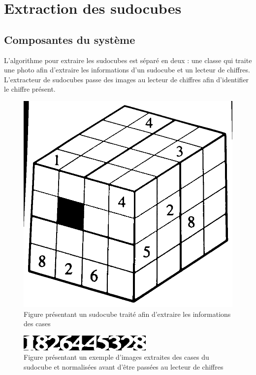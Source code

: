 \section{Extraction des sudocubes}
\subsection{Composantes du système}
L'algorithme pour extraire les sudocubes est séparé en deux : une classe qui traite une photo afin d'extraire les informations d'un sudocube et un lecteur de chiffres. L'extracteur de sudocubes passe des images au lecteur de chiffres afin d'identifier le chiffre présent. 

\begin{figure}[htbp]
\centering
\includegraphics[scale=0.25]{fig/sudocubeThreshold.png}
\caption{Figure présentant un sudocube traité afin d'extraire les informations des cases}
\label{fig:sudoThresh}
\end{figure}

\begin{figure}[htbp]
\centering
\includegraphics[scale=0.9]{fig/chiffresLues.png}
\caption{Figure présentant un exemple d'images extraites des cases du sudocube et normalisées avant d'être passées au lecteur de chiffres}
\label{fig:chifLu}
\end{figure}

